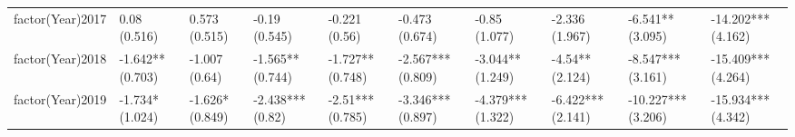 \begin{table}[ht]
\begin{tabular}{llllllllll}
  factor(Year)2017 & 0.08 (0.516) & 0.573 (0.515) & -0.19 (0.545) & -0.221 (0.56) & -0.473 (0.674) & -0.85 (1.077) & -2.336 (1.967) & -6.541** (3.095) & -14.202*** (4.162) \\ 
  factor(Year)2018 & -1.642** (0.703) & -1.007 (0.64) & -1.565** (0.744) & -1.727** (0.748) & -2.567*** (0.809) & -3.044** (1.249) & -4.54** (2.124) & -8.547*** (3.161) & -15.409*** (4.264) \\ 
  factor(Year)2019 & -1.734* (1.024) & -1.626* (0.849) & -2.438*** (0.82) & -2.51*** (0.785) & -3.346*** (0.897) & -4.379*** (1.322) & -6.422*** (2.141) & -10.227*** (3.206) & -15.934*** (4.342) \\ 
   \bottomrule
\end{tabular}
\endgroup
\end{table}
